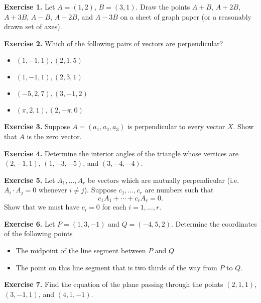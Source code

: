 \documentclass{article}
\begin{document}

\textbf{Exercise 1.}
 Let $A = (1,2)$, $B = (3,1)$. Draw the points $A+B$, $A+2B$, $A+3B$, $A-B$, $A-2B$, and $A - 3B$
 on a sheet of graph paper (or a reasonably drawn set of axes).

\textbf{Exercise 2.} Which of the following pairs of vectors are perpendicular?
\begin{itemize}
    \item $(1,-1,1), (2,1,5)$ 
    \item $(1,-1,1), (2,3,1)$ 
    \item $(-5,2,7), (3,-1,2)$
    \item $(\pi,2,1), (2,-\pi,0)$
\end{itemize}

\textbf{Exercise 3.}
Suppose $A = (a_1,a_2,a_3)$ is perpendicular to every vector $X$. Show that
$A$ is the zero vector.

\textbf{Exercise 4.}  Determine the interior angles of the triangle whose vertices are 
$(2, -1, 1)$, $(1, - 3, - 5)$, and $(3, -4, -4)$.

\textbf{Exercise 5.} Let $A_1, \ldots, A_r$ be vectors which are mutually perpendicular
(i.e. $A_i \cdot A_j = 0$ whenever $i \neq j$). Suppose $c_1, \ldots, c_r$ are numbers such that
\[c_1 A_1 + \cdots + c_r A_r = 0.\]
Show that we must have $c_i = 0$ for each $i=1,\ldots, r$.

\textbf{Exercise 6.} Let $P = (1,3, -1)$ and $Q = (-4,5,2)$. 
Determine the coordinates of the following points
\begin{itemize}
    \item The midpoint of the line segment between $P$ and $Q$
    \item The point on this line segment that is two thirds of the way from $P$ to $Q$.
\end{itemize}

\textbf{Exercise 7.} Find the equation of the plane passing through the points
$(2,1,1)$, $(3,-1,1)$, and $(4,1,-1)$.

\end{document}
